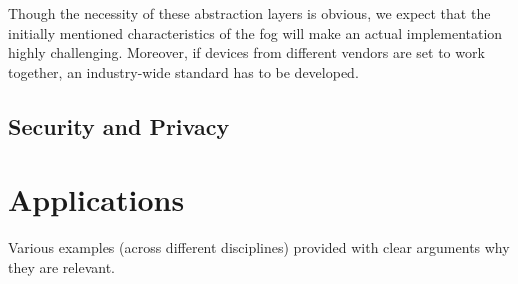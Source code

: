 \documentclass{article}
\begin{document}
Though the necessity of these abstraction layers is obvious, we expect that the initially mentioned characteristics of the fog will make an actual implementation highly challenging. Moreover, if devices from different vendors are set to work together, an industry-wide standard has to be developed.

\subsection{Security and Privacy}



\section{Applications}
Various examples (across different disciplines) provided with clear arguments why they are relevant.

\renewcommand{\refname}{\section{References}}


\end{document}
